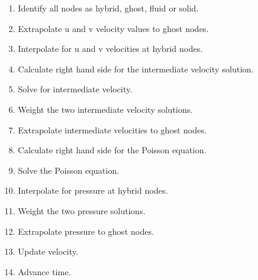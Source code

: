 \documentclass[onehalf,11pt]{beavtex}
\begin{document}
\begin{enumerate}
	\item Identify all nodes as hybrid, ghost, fluid or solid.
	\item Extrapolate u and v velocity values to ghost nodes.
	\item Interpolate for u and v velocities at hybrid nodes.
	\item Calculate right hand side for the intermediate velocity solution.
	\item Solve for intermediate velocity.
	\item Weight the two intermediate velocity solutions.
	\item Extrapolate intermediate velocities to ghost nodes.
	\item Calculate right hand side for the Poisson equation.
	\item Solve the Poisson equation.
	\item Interpolate for pressure at hybrid nodes.
	\item Weight the two pressure solutions.
	\item Extrapolate pressure to ghost nodes.
	\item Update velocity.
	\item Advance time.
\end{enumerate}
\end{document}
